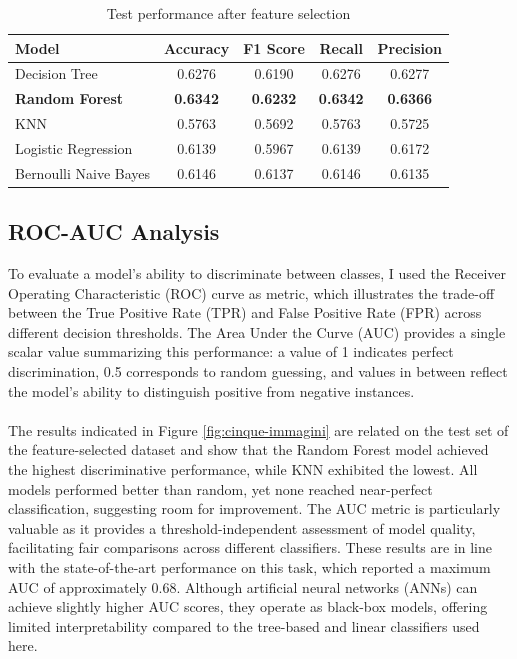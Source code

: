 \begin{table}[ht]
\centering
\caption{Test performance after feature selection}
\label{tab:test_performance_reduced}
\begin{tabular}{lcccc}
\toprule
\textbf{Model} & \textbf{Accuracy} & \textbf{F1 Score} & \textbf{Recall} & \textbf{Precision} \\
\midrule
Decision Tree & 0.6276 & 0.6190 & 0.6276 & 0.6277 \\
\textbf{Random Forest} & \textbf{0.6342} & \textbf{0.6232} & \textbf{0.6342} & \textbf{0.6366} \\
KNN & 0.5763 & 0.5692 & 0.5763 & 0.5725 \\
Logistic Regression & 0.6139 & 0.5967 & 0.6139 & 0.6172 \\
Bernoulli Naive Bayes & 0.6146 & 0.6137 & 0.6146 & 0.6135 \\
\bottomrule
\end{tabular}
\end{table}

\subsection{ROC-AUC Analysis}

To evaluate a model's ability to discriminate between classes, I used the Receiver Operating Characteristic (ROC) curve as metric, which illustrates the trade-off between the True Positive Rate (TPR) and False Positive Rate (FPR) across different decision thresholds. The Area Under the Curve (AUC) provides a single scalar value summarizing this performance: a value of 1 indicates perfect discrimination, 0.5 corresponds to random guessing, and values in between reflect the model's ability to distinguish positive from negative instances.\\\\
The results indicated in Figure \ref{fig:cinque-immagini} are related on the test set of the feature-selected dataset and show that the Random Forest model achieved the highest discriminative performance, while KNN exhibited the lowest. All models performed better than random, yet none reached near-perfect classification, suggesting room for improvement. The AUC metric is particularly valuable as it provides a threshold-independent assessment of model quality, facilitating fair comparisons across different classifiers. These results are in line with the state-of-the-art performance on this task, which reported a maximum AUC of approximately 0.68. Although artificial neural networks (ANNs) can achieve slightly higher AUC scores, they operate as black-box models, offering limited interpretability compared to the tree-based and linear classifiers used here.

